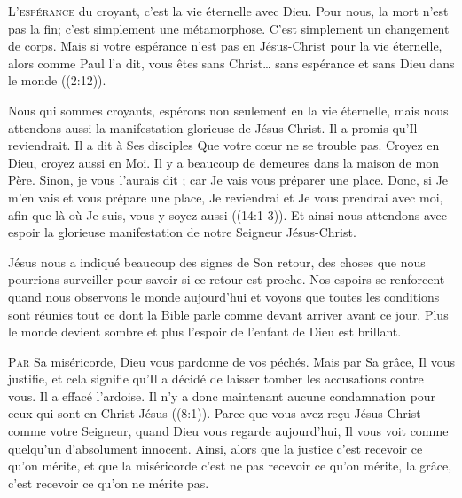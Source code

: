\lettrine{L}{'espérance} du croyant, c'est la vie éternelle avec Dieu.
 Pour nous, la mort n'est pas la fin; c'est simplement une métamorphose.
 C'est simplement un changement de corps. Mais si votre espérance n'est pas
 en Jésus-Christ pour la vie éternelle, alors comme Paul l'a dit, vous êtes
 \Og sans Christ\dots{} sans espérance et sans Dieu dans le monde \Fg{}
 ((2:12)). 


Nous qui sommes croyants, espérons non seulement en la vie éternelle,
 mais nous attendons aussi la manifestation glorieuse de Jésus-Christ.
 Il a promis qu'Il reviendrait. Il a dit à Ses disciples\frcolon{} 
 \Og Que votre c\oe{}ur ne se trouble pas. Croyez en Dieu, croyez aussi en Moi.
 Il y a beaucoup de demeures dans la maison de mon Père.
 Sinon, je vous l'aurais dit ; car Je vais vous préparer une place.
 Donc, si Je m'en vais et vous prépare une place, Je reviendrai
 et Je vous prendrai avec moi, afin que là où Je suis,
 vous y soyez aussi \Fg{} ((14:1-3)).
 Et ainsi nous attendons avec espoir la glorieuse manifestation
 de notre Seigneur Jésus-Christ. 

Jésus nous a indiqué beaucoup des signes de Son retour,
 des choses que nous pourrions surveiller pour savoir si ce retour est proche.
 Nos espoirs se renforcent quand nous observons le monde aujourd'hui
 et voyons que toutes les conditions sont réunies \ocadr tout ce dont la Bible
 parle comme devant arriver avant ce jour.
 Plus le monde devient sombre et plus l'espoir de l'enfant de Dieu
 est brillant. 

\dvrule






\lettrine{P}{ar} Sa miséricorde, Dieu vous pardonne de vos péchés.
 Mais par Sa grâce, Il vous justifie, et cela signifie qu'Il a décidé
 de laisser tomber les accusations contre vous. Il a effacé l'ardoise.
 \Og Il n'y a donc maintenant aucune condamnation pour ceux
 qui sont en Christ-Jésus \Fg{} ((8:1)).
 Parce que vous avez re\c{c}u Jésus-Christ comme votre Seigneur,
 quand Dieu vous regarde aujourd'hui, Il vous voit comme quelqu'un
 d'absolument innocent. Ainsi, alors que la justice c'est recevoir
 ce qu'on mérite, et que la miséricorde c'est ne pas recevoir
 ce qu'on mérite, la grâce, c'est recevoir ce qu'on ne mérite pas. 

